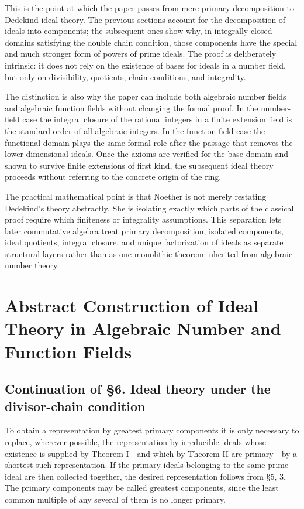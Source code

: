 \documentclass[11pt]{article}
\begin{document}
This is the point at which the paper passes from mere primary decomposition to Dedekind ideal theory. The previous sections account for the decomposition of ideals into components; the subsequent ones show why, in integrally closed domains satisfying the double chain condition, those components have the special and much stronger form of powers of prime ideals. The proof is deliberately intrinsic: it does not rely on the existence of bases for ideals in a number field, but only on divisibility, quotients, chain conditions, and integrality.


The distinction is also why the paper can include both algebraic number fields and algebraic function fields without changing the formal proof. In the number-field case the integral closure of the rational integers in a finite extension field is the standard order of all algebraic integers. In the function-field case the functional domain plays the same formal role after the passage that removes the lower-dimensional ideals. Once the axioms are verified for the base domain and shown to survive finite extensions of first kind, the subsequent ideal theory proceeds without referring to the concrete origin of the ring.

The practical mathematical point is that Noether is not merely restating Dedekind's theory abstractly. She is isolating exactly which parts of the classical proof require which finiteness or integrality assumptions. This separation lets later commutative algebra treat primary decomposition, isolated components, ideal quotients, integral closure, and unique factorization of ideals as separate structural layers rather than as one monolithic theorem inherited from algebraic number theory.

\clearpage
\section{Abstract Construction of Ideal Theory in Algebraic Number and
Function
Fields}\label{abstract-construction-of-ideal-theory-in-algebraic-number-and-function-fields}

\subsection{Continuation of §6. Ideal theory under the divisor-chain
condition}\label{continuation-of-6.-ideal-theory-under-the-divisor-chain-condition}

To obtain a representation by greatest primary components it is only
necessary to replace, wherever possible, the representation by
irreducible ideals whose existence is supplied by Theorem I - and which
by Theorem II are primary - by a shortest such representation. If the
primary ideals belonging to the same prime ideal are then collected
together, the desired representation follows from §5, 3. The primary
components may be called greatest components, since the least common
multiple of any several of them is no longer primary.
\end{document}
